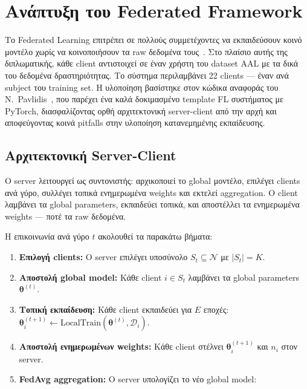 
\section{Ανάπτυξη του Federated Framework}
\label{sec:fl_framework}

Το Federated Learning επιτρέπει σε πολλούς συμμετέχοντες να εκπαιδεύσουν κοινό μοντέλο χωρίς να κοινοποιήσουν τα raw δεδομένα τους~\cite{McMahan2017}. Στο πλαίσιο αυτής της διπλωματικής, κάθε client αντιστοιχεί σε έναν χρήστη του dataset AAL με τα δικά του δεδομένα δραστηριότητας. Το σύστημα περιλαμβάνει 22 clients — έναν ανά subject του training set. Η υλοποίηση βασίστηκε στον κώδικα αναφοράς του N.\ Pavlidis~\cite{PavlidisFL2021}, που παρέχει ένα καλά δοκιμασμένο template FL συστήματος με PyTorch, διασφαλίζοντας ορθή αρχιτεκτονική server-client από την αρχή και αποφεύγοντας κοινά pitfalls στην υλοποίηση κατανεμημένης εκπαίδευσης.

\subsection{Αρχιτεκτονική Server-Client}

Ο server λειτουργεί ως συντονιστής: αρχικοποιεί το global μοντέλο, επιλέγει clients ανά γύρο, συλλέγει τοπικά ενημερωμένα weights και εκτελεί aggregation. Ο client λαμβάνει τα global parameters, εκπαιδεύει τοπικά, και αποστέλλει τα ενημερωμένα weights — ποτέ τα raw δεδομένα.

Η επικοινωνία ανά γύρο $t$ ακολουθεί τα παρακάτω βήματα:

\begin{enumerate}
    \item \textbf{Επιλογή clients:} Ο server επιλέγει υποσύνολο $S_t \subseteq \mathcal{N}$ με $|S_t| = K$.
    \item \textbf{Αποστολή global model:} Κάθε client $i \in S_t$ λαμβάνει τα global parameters $\boldsymbol{\theta}^{(t)}$.
    \item \textbf{Τοπική εκπαίδευση:} Κάθε client εκπαιδεύει για $E$ εποχές:
    $\boldsymbol{\theta}_i^{(t+1)} \gets \text{LocalTrain}(\boldsymbol{\theta}^{(t)}, \mathcal{D}_i)$.
    \item \textbf{Αποστολή ενημερωμένων weights:} Κάθε client στέλνει $\boldsymbol{\theta}_i^{(t+1)}$ και $n_i$ στον server.
    \item \textbf{FedAvg aggregation:} Ο server υπολογίζει το νέο global model:
\end{enumerate}

